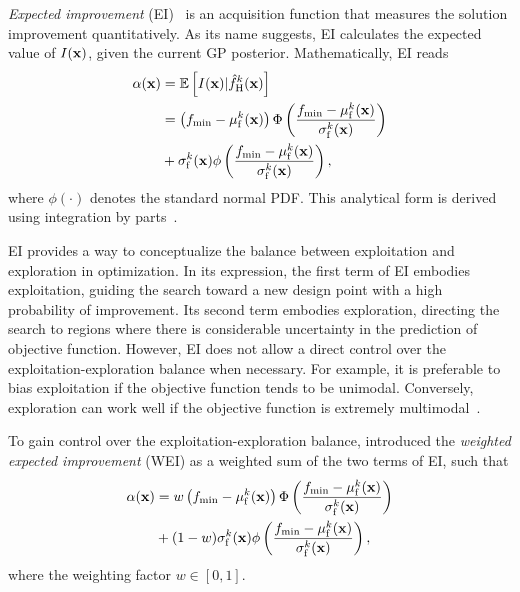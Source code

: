\documentclass[iicol,sn-basic]{sn-jnl}%
\begin{document}
\textit{Expected improvement} (EI)~\citep{Mockus1975,Jones1998} is an acquisition function that measures the solution improvement quantitatively.
As its name suggests, EI calculates the expected value of $I({\bf x})$, given the current GP posterior.
Mathematically, EI reads
\begin{equation}\label{eqn39}
	\begin{aligned}
		\alpha({\bf x}) & = \mathbb{E}\left[I({\bf x})|\hat{f}_\text{H}^k({\bf x})\right]\\
		& =\left( f_\text{min}-\mu_\text{f}^k({\bf x})\right)\Phi\left(\frac{f_\text{min}-\mu_\text{f}^k({\bf x})}{\sigma_\text{f}^k({\bf x})}\right)\\
		&+\sigma_\text{f}^k({\bf x})\phi\left(\frac{f_\text{min}-\mu_\text{f}^k({\bf x})}{\sigma_\text{f}^k({\bf x})}\right),
	\end{aligned}
\end{equation}
where $\phi(\cdot)$ denotes the standard normal PDF.
This analytical form is derived using integration by parts~\citep{Jones1998,Kochenderfer2019}.

EI provides a way to conceptualize the balance between exploitation and exploration in optimization.
In its expression, the first term of EI embodies exploitation, guiding the search toward a new design point with a high probability of improvement.
Its second term embodies exploration, directing the search to regions where there is considerable uncertainty in the prediction of objective function.
However, EI does not allow a direct control over the exploitation-exploration balance when necessary.
For example, it is preferable to bias exploitation if the objective function tends to be unimodal.
Conversely, exploration can work well if the objective function is extremely multimodal~\citep{Sobester2005}.

To gain control over the exploitation-exploration balance, \cite{Sobester2005} introduced the \textit{weighted expected improvement} (WEI) as a weighted sum of the two terms of EI, such that
\begin{equation}\label{eqn40}
	\begin{aligned}
		\alpha({\bf x}) & = w\left( f_\text{min}-\mu_\text{f}^k({\bf x})\right)\Phi\left(\frac{f_\text{min}-\mu_\text{f}^k({\bf x})}{\sigma_\text{f}^k({\bf x})}\right)\\
		&+(1-w)\sigma_\text{f}^k({\bf x})\phi\left(\frac{f_\text{min}-\mu_\text{f}^k({\bf x})}{\sigma_\text{f}^k({\bf x})}\right),
	\end{aligned}
\end{equation}
where the weighting factor $w \in [0,1]$.
\end{document}
